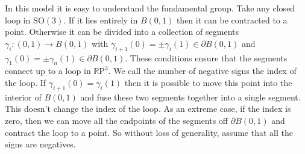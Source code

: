 \documentclass[twoside,11pt,a4paper,leqno]{article}
\numberwithin{equation}{section}
\theoremstyle{plain}
\theoremstyle{definition}
\newcommand{\RP}{\mathbb{R}\mathrm{P}}
\newcommand{\SO}{\mathrm{SO}}
\begin{document}
In this model it is easy to understand the fundamental group.
Take any closed loop in $\SO(3)$.
If it lies entirely in $B(0,1)$ then it can be contracted to a point.
Otherwise it can be divided into a collection of segments $\gamma_i : (0,1) \to B(0,1)$ with $\gamma_{i+1}(0) = \pm \gamma_i(1) \in \partial B(0,1)$ and $\gamma_1(0) = \pm \gamma_n(1) \in \partial B(0,1)$.
These conditions ensure that the segments connect up to a loop in $\RP^3$.
We call the number of negative signs the index of the loop.
If $\gamma_{i+1}(0) = \gamma_i(1)$ then it is possible to move this point into the interior of $B(0,1)$ and fuse these two segments together into a single segment.
This doesn't change the index of the loop.
As an extreme case, if the index is zero, then we can move all the endpoints of the segments off $\partial B(0,1)$ and contract the loop to a point.
So without loss of generality, assume that all the signs are negatives.
\begin{center}
\end{center}
\end{document}
